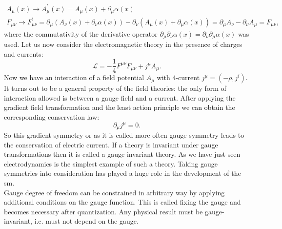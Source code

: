 \begin{equation}
\begin{array}{lcl} 
A_{\mu}(x) \rightarrow A^{\prime}_{\mu}(x)  = A_{\mu}(x)+\partial_{\mu}\alpha(x)  \\ 
F_{\mu \nu} \rightarrow F^{\prime}_{\mu \nu}  = \partial_{\mu}(A_{\nu}(x)+\partial_{\nu}\alpha(x))-\partial_{\nu}(A_{\mu}(x)+\partial_{\mu}\alpha(x))=\partial_{\mu}A_{\nu} - \partial_{\nu}A_{\mu}=F_{\mu \nu},
\end{array} 
\end{equation}
where the commutativity of the derivative operator $\partial_{\mu}\partial_{\nu}\alpha(x)=\partial_{\nu}\partial_{\mu}\alpha(x)$ was used.
Let us now consider the electromagnetic theory in the presence of charges and currents:
 \begin{equation}
\mathcal{L} = -\frac{1}{4} F^{\mu \nu}F_{\mu \nu} + j^{\mu}A_{\mu}.
\end{equation}
Now we have an interaction of a field potential $A_{\mu}$ with 4-current $j^{\mu}=(-\rho,j^{i})$. It turns out to be a general property of the field theories: the only form of interaction allowed is between a gauge field and a current.  After applying the gradient field transformation and the least action principle we can obtain the corresponding conservation law:
\begin{equation}
\partial_{\mu}j^{\mu}=0.
\end{equation}
 So this gradient symmetry\cite{bogol} or as it is called more often gauge symmetry leads to the conservation of electric current. If a theory is invariant under gauge transformations then it is called a gauge invariant theory. As we have just seen electrodynamics is the simplest example of such a theory. Taking gauge symmetries into consideration \cite{YangMills} has played a huge role in the development of the \gls{sm}.\\
 Gauge degree of freedom can be constrained in arbitrary way by applying additional conditions on the gauge function. This is called fixing the gauge and becomes necessary after quantization. Any physical result must be gauge-invariant, i.e. must not depend on the gauge. 


